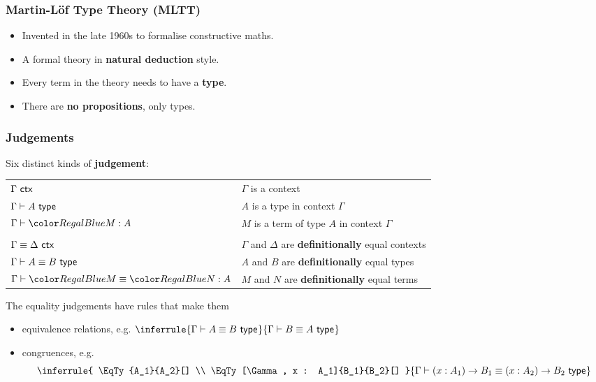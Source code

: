 \documentclass[handout]{beamer} %
\begin{document}
\begin{frame}
  \frametitle{Martin-L\"of Type Theory (MLTT)}

  \begin{itemize}
    \item Invented in the late 1960s to formalise constructive maths.
    \item A formal theory in \textbf{natural deduction} style.
    \item Every term in the theory needs to have a \textbf{type}.
    \item There are \textbf{no propositions}, only types.
  \end{itemize}
  
  \begin{center}
  \end{center}
\end{frame}

\begin{frame}
  \frametitle{Judgements}
  
  Six distinct kinds of \textbf{judgement}:
  \begin{center}
    \begin{tabular}{ll}
      $\Gamma\ \mathsf{ctx}_{}$    & $\Gamma$ is a context \\
      $\IsTy{A}[]$        & $A$ is a type in context $\Gamma$ \\
      $\IsTm{M}{A}$       & $M$ is a term of type $A$ in context $\Gamma$ \\
      & \\
      $\Gamma \equiv \Delta\ \mathsf{ctx}_{}$  & $\Gamma$ and $\Delta$ are \textbf{definitionally} equal contexts \\
      $\EqTy{A}{B}[]$             & $A$ and $B$ are \textbf{definitionally} equal types \\
      $\EqTm{M}{N}{A}$          & $M$ and $N$ are \textbf{definitionally} equal terms
    \end{tabular}
  \end{center}
  The equality judgements have rules that make them
  \begin{itemize}
    \item equivalence relations, e.g. $
        \inferrule{
          \EqTy{A}{B}[]
        }{
          \EqTy{B}{A}[]
        }
    $
    \item congruences, e.g. \[
      \inferrule{
        \EqTy{A_1}{A_2}[] \\
        \EqTy[\Gamma, x : A_1]{B_1}{B_2}[]
      }{
        \EqTy{\Fn{x}{A_1}{B_1}}{\Fn{x}{A_2}{B_2}}[]
      }
    \]
  \end{itemize}
\end{frame}
\end{document}
